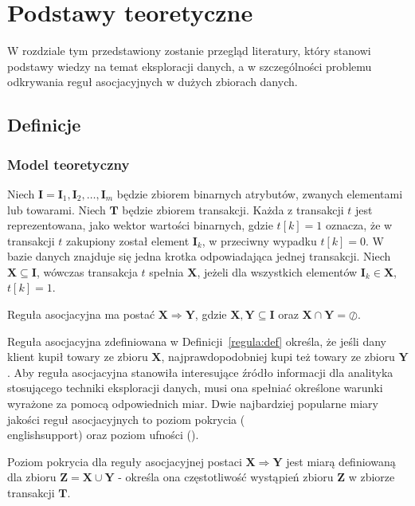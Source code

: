 
\chapter{Podstawy teoretyczne}

W rozdziale tym przedstawiony zostanie przegląd literatury, który stanowi podstawy wiedzy na temat eksploracji danych, a w szczególności problemu odkrywania reguł asocjacyjnych w dużych zbiorach danych.

\section{Definicje}

\subsection{Model teoretyczny}

Niech $\mathbf{I} = \mathbf{I}_1, \mathbf{I}_2, \ldots, \mathbf{I}_m$ będzie zbiorem binarnych atrybutów, zwanych elementami lub towarami. Niech $\mathbf{T}$ będzie zbiorem transakcji. Każda z transakcji $t$ jest reprezentowana, jako wektor wartości binarnych, gdzie $t[k]=1$ oznacza, że w transakcji $t$ zakupiony został element $\mathbf{I}_k$, w przeciwny wypadku $t[k]=0$. W bazie danych znajduje się jedna krotka odpowiadająca jednej transakcji. Niech $\mathbf{X} \subseteq \mathbf{I}$, wówczas transakcja $t$ spełnia $\mathbf{X}$, jeżeli dla wszystkich elementów $\mathbf{I}_k \in \mathbf{X}$, $t[k]=1$.

\begin{df}\label{regula:def}
Reguła asocjacyjna ma postać $\mathbf{X} \Rightarrow \mathbf{Y}$, gdzie $\mathbf{X}, \mathbf{Y} \subseteq \mathbf{I}$ oraz $\mathbf{X} \cap \mathbf{Y} = \oslash$.
\end{df}

Reguła asocjacyjna zdefiniowana w Definicji~\ref{regula:def} określa, że jeśli dany klient kupił towary ze zbioru $\mathbf{X}$, najprawdopodobniej kupi też towary ze zbioru $\mathbf{Y}$. Aby reguła asocjacyjna stanowiła interesujące źródło informacji dla analityka stosującego techniki eksploracji danych, musi ona spełniać określone warunki wyrażone za pomocą odpowiednich miar. Dwie najbardziej popularne miary jakości reguł asocjacyjnych to poziom pokrycia (\\english{support}) oraz poziom ufności ().

\begin{df}\label{support:def}
Poziom pokrycia dla reguły asocjacyjnej postaci $\mathbf{X} \Rightarrow \mathbf{Y}$ jest miarą definiowaną dla zbioru $\mathbf{Z} = \mathbf{X} \cup \mathbf{Y}$ - określa ona częstotliwość wystąpień zbioru $\mathbf{Z}$ w zbiorze transakcji $\mathbf{T}$.
\end{df}

